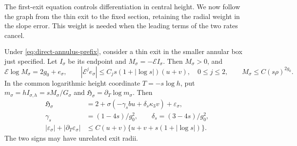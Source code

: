 The first-exit equation controls differentiation in central height.
We now follow the graph from the thin exit to the fixed section,
retaining the radial weight in the slope error. This weight is needed
when the leading terms of the two rates cancel.

\begin{lemma}
\label{lem:direct-annulus-rates}
Under \eqref{eq:direct-annulus-prefix}, consider a thin exit
in the smaller annular box just specified. Let \(I_\sigma\)
be its endpoint and \(M_\sigma=-\mathcal E I_\sigma\).
Then \(M_\sigma>0\), and
\begin{equation}
\label{eq:direct-annulus-endpoint-rate}
 \mathcal E\log M_\sigma=2g_0+e_\sigma,\qquad
 |\mathcal E^j e_\sigma|
       \le C_js(1+|\log s|)(u+v),\quad 0\le j\le2,\qquad
 M_\sigma\le C(s\rho)^{2g_0} .
\end{equation}
In the common logarithmic height coordinate \(T=-s\log h\), put
\(m_\sigma=hI_{\sigma,h}=sM_\sigma/G_\sigma\) and
\(\mathfrak H_\sigma=\partial_T\log m_\sigma\).
Then
\begin{equation}
\label{eq:direct-annulus-clock-rate}
 \begin{split}
 \mathfrak H_\sigma
   &=2+\sigma(-\gamma_sbu+\delta_s\kappa_3 v)+\varepsilon_\sigma,\\
 \gamma_s&=(1-4s)/g_0^2,\qquad
 \delta_s=(3-4s)/g_0^2,\\
 |\varepsilon_\sigma|+|\partial_T\varepsilon_\sigma|
   &\le C(u+v)\{u+v+s(1+|\log s|)\}.
 \end{split}
\end{equation}
The two signs may have unrelated exit radii.
\end{lemma}

